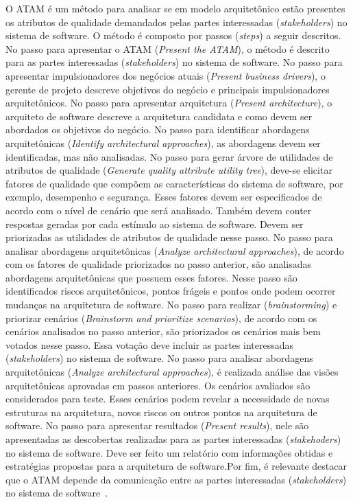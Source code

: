 O ATAM é um método para analisar se em modelo arquitetônico estão presentes os atributos de qualidade demandados pelas partes interessadas (\emph{stakeholders}) no sistema de software. O método é composto por passos (\emph{steps}) a seguir descritos. No passo para apresentar o ATAM (\emph{Present the ATAM}), o método é descrito para as partes interessadas (\emph{stakeholders}) no sistema de software. No passo para apresentar impulsionadores dos negócios atuais (\emph{Present business drivers}), o gerente de projeto descreve objetivos do negócio e principais impulsionadores arquitetônicos. No passo para apresentar arquitetura (\emph{Present architecture}), o arquiteto de software descreve a arquitetura candidata e como devem ser abordados os objetivos do negócio. No passo para identificar abordagens arquitetônicas (\emph{Identify architectural approaches}), as abordagens devem ser identificadas, mas não analisadas. No passo para gerar árvore de utilidades de atributos de qualidade (\emph{Generate quality attribute utility tree}), deve-se elicitar fatores de qualidade que compõem as características do sistema de software, por exemplo, desempenho e segurança. Esses fatores devem ser especificados de acordo com o nível de cenário que será analisado. Também devem conter respostas geradas por cada estímulo ao sistema de software. Devem ser priorizadas as utilidades de atributos de qualidade nesse passo. No passo para analisar abordagens arquitetônicas (\emph{Analyze architectural approaches}), de acordo com os fatores de qualidade priorizados no passo anterior, são analisadas abordagens arquitetônicas que possuem esses fatores. Nesse passo são identificados riscos arquitetônicos, pontos frágeis e pontos onde podem ocorrer mudanças na arquitetura de software. No passo para realizar (\emph{brainstorming}) e priorizar cenários (\emph{Brainstorm and prioritize scenarios}), de acordo com os cenários analisados no passo anterior, são priorizados os cenários mais bem votados nesse passo. Essa votação deve incluir as partes interessadas (\emph{stakeholders}) no sistema de software. No passo para analisar abordagens arquitetônicas (\emph{Analyze architectural approaches}), é realizada análise das visões arquitetônicas aprovadas em passos anteriores. Os cenários avaliados são considerados para teste. Esses cenários podem revelar a necessidade de novas estruturas na arquitetura, novos riscos ou outros pontos na arquitetura de software. No passo para apresentar resultados (\emph{Present results}), nele são apresentadas as descobertas realizadas para as partes interessadas (\emph{stakehoders}) no sistema de software. Deve ser feito um relatório com informações obtidas e estratégias propostas para a arquitetura de software.Por fim, é relevante destacar que o ATAM depende da comunicação entre as partes interessadas (\emph{stakeholders}) no sistema de software~\cite{ATAM}.

